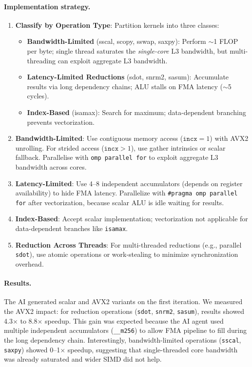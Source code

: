 \documentclass[11pt,a4paper]{article}
\begin{document}
\paragraph{Implementation strategy.}

\begin{enumerate}
    \item \textbf{Classify by Operation Type}: Partition kernels into three classes:
    \begin{itemize}
        \item \textbf{Bandwidth-Limited} (sscal, scopy, sswap, saxpy): Perform $\sim$1 FLOP per byte; single thread saturates the \emph{single-core} L3 bandwidth, but multi-threading can exploit aggregate L3 bandwidth.
        \item \textbf{Latency-Limited Reductions} (sdot, snrm2, sasum): Accumulate results via long dependency chains; ALU stalls on FMA latency ($\sim$5 cycles).
        \item \textbf{Index-Based} (isamax): Search for maximum; data-dependent branching prevents vectorization.
    \end{itemize}
    \item \textbf{Bandwidth-Limited}: Use contiguous memory access ($\texttt{incx} = 1$) with AVX2 unrolling. For strided access ($\texttt{incx} > 1$), use gather intrinsics or scalar fallback. Parallelise with \texttt{omp parallel for} to exploit aggregate L3 bandwidth across cores.
    \item \textbf{Latency-Limited}: Use 4--8 independent accumulators (depends on register availability) to hide FMA latency. Parallelize with \texttt{\#pragma omp parallel for} after vectorization, because scalar ALU is idle waiting for results.
    \item \textbf{Index-Based}: Accept scalar implementation; vectorization not applicable for data-dependent branches like \texttt{isamax}.
    \item \textbf{Reduction Across Threads}: For multi-threaded reductions (e.g., parallel \texttt{sdot}), use atomic operations or work-stealing to minimize synchronization overhead.
\end{enumerate}

\paragraph{Results.}
The AI generated scalar and AVX2 variants on the first iteration. We measured the AVX2 impact: for reduction operations (\texttt{sdot}, \texttt{snrm2}, \texttt{sasum}), results showed 4.3$\times$ to 8.8$\times$ speedup. This gain was expected because the AI agent used multiple independent accumulators (\texttt{\_\_m256}) to allow FMA pipeline to fill during the long dependency chain. Interestingly, bandwidth-limited operations (\texttt{sscal}, \texttt{saxpy}) showed 0--1$\times$ speedup, suggesting that single-threaded core bandwidth was already saturated and wider SIMD did not help.\\
\end{document}
